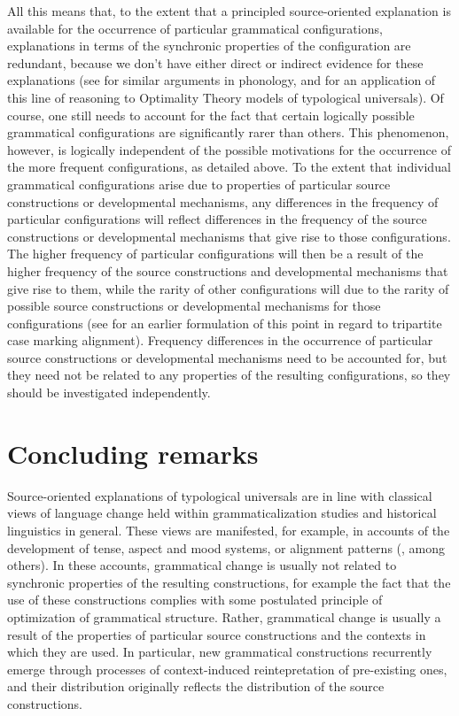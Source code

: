\documentclass[output=paper]{langsci/langscibook}
\begin{document}
All this means that, to the extent that a principled source-oriented
explanation is available for the occurrence of particular grammatical
configurations, explanations in terms of the synchronic properties of
the configuration are redundant, because we don't have either direct
or indirect evidence for these explanations (see \citealt{Blevins2004} for
similar arguments in phonology, and \citealt{Newmeyer2002,Newmeyer2004} for an application of
this line of reasoning to Optimality Theory models of typological
universals). Of course, one still needs to account for the fact that
certain logically possible grammatical configurations
are significantly rarer than others. This phenomenon, however, is logically
independent of the possible motivations for the occurrence of the more
frequent configurations, as
detailed above. To the extent that
individual grammatical configurations arise due to properties of
particular source constructions or developmental mechanisms, any differences in the frequency of particular
configurations will reflect differences in the frequency of
the source constructions or developmental mechanisms that give
rise to those configurations. The higher
frequency of particular configurations will then  be a result of the higher frequency of the  source
constructions and developmental mechanisms that give rise to them,
while the rarity of other configurations
will  due to the rarity of possible
source constructions or developmental mechanisms for those
configurations (see \citealt{Harris2008} for an earlier formulation of this point
in regard to tripartite case marking alignment). Frequency differences in the occurrence of particular source
constructions or developmental mechanisms need to be
accounted for, but they need not be related to any properties of the
resulting configurations, so they should be investigated independently.

\section{Concluding remarks}
Source-oriented explanations of typological universals are  in line with classical
views of language change held within
grammaticalization studies and historical linguistics in
general. These views are manifested, for example, in accounts of the
development of tense, aspect and mood systems, or alignment
patterns (\citealt{BybeeEtAl1994,HarrisCampbell1995,Gildea1998,TraugottDasher2005}, among others). In these accounts, grammatical change
is usually not related to synchronic properties of the resulting
constructions, for example the fact that the use of these
constructions complies with some postulated principle of optimization
of grammatical structure. Rather, grammatical change is usually a result of the properties of particular
source constructions and the contexts in which they are used. In
particular, new grammatical constructions recurrently emerge through
processes of context-induced reintepretation of pre-existing
ones, and their distribution originally reflects the distribution of the
source constructions. 
\end{document}
